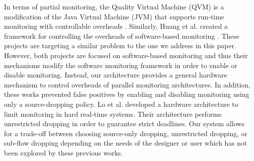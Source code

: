 In terms of partial monitoring, the Quality Virtual Machine (QVM) is a
modification of the Java Virtual Machine (JVM) that supports run-time
monitoring with controllable overheads \cite{qvm-oopsla08}. Similarly, Huang et
al. created a framework for controlling the overheads of software-based
monitoring \cite{huang-sttt12}. These projects are targeting a similar problem
to the one we address in this paper. However, both projects are focused on
software-based monitoring and thus their mechanisms modify the software
monitoring framework in order to enable or disable monitoring. Instead, our
architecture provides a general hardware mechanism to control overheads of
parallel monitoring architectures. In addition, these works prevented
false positives by enabling and disabling monitoring using only a source-dropping
policy. Lo et al. \cite{lo-rtas14} developed a hardware architecture to limit
monitoring in hard real-time systems. Their architecture performs unrestricted 
dropping in order to guarantee strict deadlines. Our system allows for a
trade-off between choosing source-only dropping, unrestricted dropping, or sub-flow 
dropping depending on the needs of the designer or user which has not been
explored by these previous works. 
